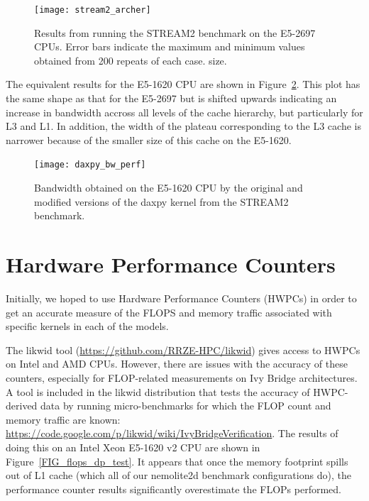 \documentclass[12pt]{article}
\begin{document}
\begin{figure}
\texttt{[image: stream2\_archer]}
\caption{Results from running the STREAM2 benchmark on the E5-2697
  CPUs. Error bars indicate the maximum and minimum values obtained
  from 200 repeats of each case.  size. }
\label{FIG_stream2}
\end{figure}

 The equivalent results for the E5-1620 CPU are shown in
 Figure~\ref{FIG_daxpy_bw}. This plot has the same shape as that for
 the E5-2697 but is shifted upwards indicating an increase in
 bandwidth accross all levels of the cache hierarchy, but particularly
 for L3 and L1. In addition, the width of the plateau corresponding to
 the L3 cache is narrower because of the smaller size of this cache on
 the E5-1620.

\begin{figure}
\texttt{[image: daxpy\_bw\_perf]}
\caption{Bandwidth obtained on the E5-1620 CPU by the original and
  modified versions of the daxpy kernel from the STREAM2 benchmark.}
\label{FIG_daxpy_bw}
\end{figure}

\section{Hardware Performance Counters}

Initially, we hoped to use Hardware Performance Counters (HWPCs) in
order to get an accurate measure of the FLOPS and memory traffic
associated with specific kernels in each of the models.

The likwid tool (\url{https://github.com/RRZE-HPC/likwid}) gives
access to HWPCs on Intel and AMD CPUs.
However, there are issues with the accuracy of these counters,
especially for FLOP-related measurements on Ivy Bridge architectures. A
tool is included in the likwid distribution that tests the accuracy of
HWPC-derived data by running micro-benchmarks for which the FLOP count
and memory traffic are known:
\url{https://code.google.com/p/likwid/wiki/IvyBridgeVerification}.
The results of doing this on an Intel Xeon E5-1620 v2 CPU are shown in
Figure~\ref{FIG_flops_dp_test}. It appears that once the memory
footprint spills out of L1 cache (which all of our nemolite2d
benchmark configurations do), the performance counter results
significantly overestimate the FLOPs performed.
\end{document}
